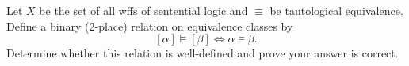 \begin{problem}[5]
  Let $X$ be the set of all wffs of sentential logic
  and $\equiv$ be tautological equivalence.
  Define a binary (2-place) relation on equivalence classes by
  \[ [\alpha] \models [\beta] \iff \alpha \models \beta. \]
  Determine whether this relation is well-defined
  and prove your answer is correct.
\end{problem}
